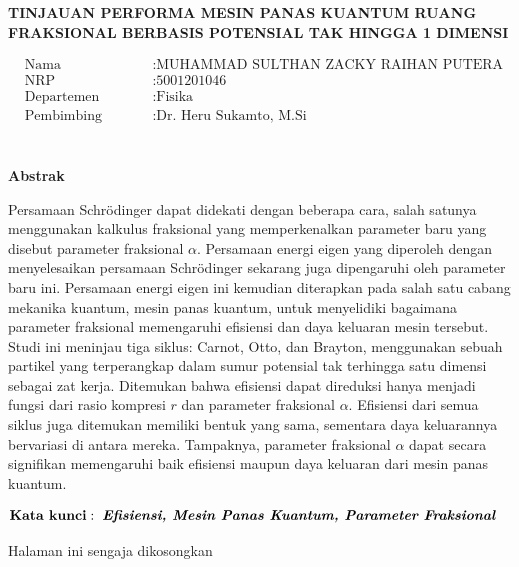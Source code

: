 \begin{center}
	\large{\textbf{TINJAUAN PERFORMA MESIN PANAS KUANTUM RUANG FRAKSIONAL BERBASIS POTENSIAL TAK HINGGA 1 DIMENSI}}
\end{center}
\begin{minipage}{5cm}
\begin{align*}
&\text{Nama} \qquad &&: \text{MUHAMMAD SULTHAN ZACKY RAIHAN PUTERA HASAN} \\
&\text{NRP} \qquad &&: \text{5001201046} \\
&\text{Departemen} \qquad &&: \text{Fisika} \\
&\text{Pembimbing} \qquad &&: \text{Dr. Heru Sukamto, M.Si} \\
\end{align*}
\end{minipage} \\
\textbf{Abstrak} 
\par Persamaan Schrödinger dapat didekati dengan beberapa cara, salah satunya menggunakan kalkulus fraksional yang memperkenalkan parameter baru yang disebut parameter fraksional \(\alpha\). Persamaan energi eigen yang diperoleh dengan menyelesaikan persamaan Schrödinger sekarang juga dipengaruhi oleh parameter baru ini. Persamaan energi eigen ini kemudian diterapkan pada salah satu cabang mekanika kuantum, mesin panas kuantum, untuk menyelidiki bagaimana parameter fraksional memengaruhi efisiensi dan daya keluaran mesin tersebut. Studi ini meninjau tiga siklus: Carnot, Otto, dan Brayton, menggunakan sebuah partikel yang terperangkap dalam sumur potensial tak terhingga satu dimensi sebagai zat kerja. Ditemukan bahwa efisiensi dapat direduksi hanya menjadi fungsi dari rasio kompresi \(r\) dan parameter fraksional \(\alpha\). Efisiensi dari semua siklus juga ditemukan memiliki bentuk yang sama, sementara daya keluarannya bervariasi di antara mereka. Tampaknya, parameter fraksional \(\alpha\) dapat secara signifikan memengaruhi baik efisiensi maupun daya keluaran dari mesin panas kuantum.\\
\begin{minipage}{1cm}
	\begin{align*}
	\text{\textbf{Kata kunci}}:\hspace{2mm}&\text{\textbf{\textit{Efisiensi, Mesin Panas Kuantum, Parameter Fraksional}}}
	\end{align*}
\end{minipage}

\newpage
\thispagestyle{empty}
\vspace*{\fill}
    \begin{center}
	Halaman ini sengaja dikosongkan
    \end{center}
\vspace*{\fill}
\pagebreak